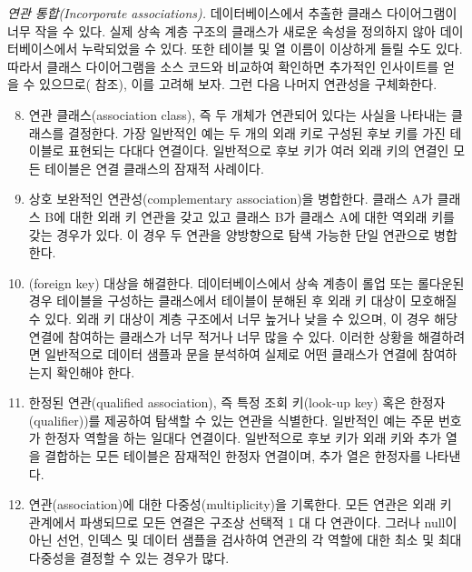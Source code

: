 \documentclass[a4paper,10pt,twoside]{book}
\begin{document}
\noindent
\emph{연관 통합(Incorporate associations).}
데이터베이스에서 추출한 클래스 다이어그램이 너무 작을 수 있다. 실제 상속 계층 구조의 클래스가 새로운 속성을 정의하지 않아 데이터베이스에서 누락되었을 수 있다. 또한 테이블 및 열 이름이 이상하게 들릴 수도 있다. 따라서 클래스 다이어그램을 소스 코드와 비교하여 확인하면 추가적인 인사이트를 얻을 수 있으므로( 참조), 이를 고려해 보자. 그런 다음 나머지 연관성을 구체화한다.

\begin{enumerate}\setcounter{enumi}{7}
  \item 연관 클래스(association class), 즉 두 개체가 연관되어 있다는 사실을 나타내는 클래스를 결정한다. 가장 일반적인 예는 두 개의 외래 키로 구성된 후보 키를 가진 테이블로 표현되는 다대다 연결이다. 일반적으로 후보 키가 여러 외래 키의 연결인 모든 테이블은 연결 클래스의 잠재적 사례이다.

  \item 상호 보완적인 연관성(complementary association)을 병합한다. 클래스 A가 클래스 B에 대한 외래 키 연관을 갖고 있고 클래스 B가 클래스 A에 대한 역외래 키를 갖는 경우가 있다. 이 경우 두 연관을 양방향으로 탐색 가능한 단일 연관으로 병합한다.

  \item {}(foreign key) 대상을 해결한다. 데이터베이스에서 상속 계층이 롤업 또는 롤다운된 경우 테이블을 구성하는 클래스에서 테이블이 분해된 후 외래 키 대상이 모호해질 수 있다. 외래 키 대상이 계층 구조에서 너무 높거나 낮을 수 있으며, 이 경우 해당 연결에 참여하는 클래스가 너무 적거나 너무 많을 수 있다. 이러한 상황을 해결하려면 일반적으로 데이터 샘플과  문을 분석하여 실제로 어떤 클래스가 연결에 참여하는지 확인해야 한다.

  \item 한정된 연관(qualified association), 즉 특정 조회 키(look-up key) 혹은 한정자(qualifier))를 제공하여 탐색할 수 있는 연관을 식별한다. 일반적인 예는 주문 번호가 한정자 역할을 하는 일대다 연결이다. 일반적으로 후보 키가 외래 키와 추가 열을 결합하는 모든 테이블은 잠재적인 한정자 연결이며, 추가 열은 한정자를 나타낸다.

  \item 연관(association)에 대한 다중성(multiplicity)을 기록한다. 모든 연관은 외래 키 관계에서 파생되므로 모든 연결은 구조상 선택적 1 대 다 연관이다. 그러나 null이 아닌 선언, 인덱스 및 데이터 샘플을 검사하여 연관의 각 역할에 대한 최소 및 최대 다중성을 결정할 수 있는 경우가 많다.

\end{enumerate}
\end{document}
